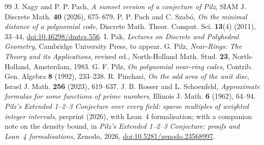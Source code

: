 \documentclass[11pt]{amsart}
\numberwithin{equation}{section}
\theoremstyle{definition}
\theoremstyle{remark}
\begin{document}
\begin{thebibliography}{99}
 J. Nagy and P. P. Pach, \emph{A sumset version of a conjecture of Pilz}, SIAM J. Discrete Math. \textbf{40} (2026), 675--679.
 P. P. Pach and C. Szab\'o, \emph{On the minimal distance of a polynomial code}, Discrete Math. Theor. Comput. Sci. \textbf{13}(4) (2011), 33--44, \href{https://doi.org/10.46298/dmtcs.556}{doi:10.46298/dmtcs.556}.
 I. Pak, \emph{Lectures on Discrete and Polyhedral Geometry}, Cambridge University Press, to appear.
 G. Pilz, \emph{Near-Rings: The Theory and its Applications}, revised ed., North-Holland Math. Stud. \textbf{23}, North-Holland, Amsterdam, 1983.
 G. F. Pilz, \emph{On polynomial near-ring codes}, Contrib. Gen. Algebra \textbf{8} (1992), 233--238.
 R. Pinchasi, \emph{On the odd area of the unit disc}, Israel J. Math. \textbf{256} (2023), 619--637.
 J. B. Rosser and L. Schoenfeld, \emph{Approximate formulas for some functions of prime numbers}, Illinois J. Math. \textbf{6} (1962), 64--94.
 \emph{Pilz's Extended 1--2--3 Conjecture over every field: sparse multiples of weighted integer intervals}, preprint (2026), with Lean~4 formalisation; with a companion note on the density bound, in \emph{Pilz's Extended 1--2--3 Conjecture: proofs and Lean~4 formalisations}, Zenodo, 2026, \href{https://doi.org/10.5281/zenodo.23568997}{doi:10.5281/zenodo.23568997}.
\end{thebibliography}
\end{document}

